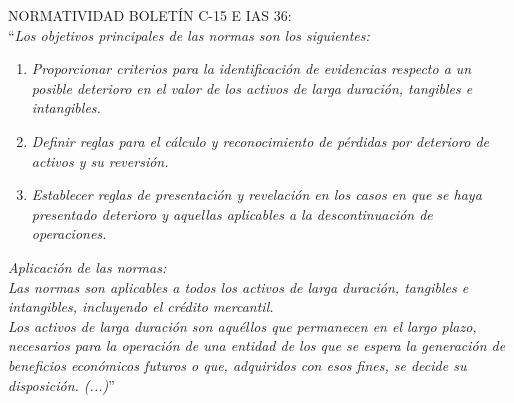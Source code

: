 \textcolor{principal}{NORMATIVIDAD BOLETÍN C-15 E IAS 36:}\\[10pt]

``\textit{Los objetivos principales de las normas son los siguientes:}\\

\begin{enumerate}[\itshape (a)]

\item \textit{Proporcionar criterios para la identificación de evidencias respecto a un posible deterioro en el valor de los activos de larga duración, tangibles e intangibles.}

\item \textit{Definir reglas para el cálculo y reconocimiento de pérdidas por deterioro de activos y su reversión.}

\item \textit{Establecer reglas de presentación y revelación en los casos en que se haya presentado deterioro y aquellas aplicables a la descontinuación de operaciones.}
\end{enumerate}


\textit{Aplicación de las normas:}\\

\textit{Las normas son aplicables a todos los activos de larga duración, tangibles e intangibles, incluyendo el crédito mercantil.}\\

\textit{Los activos de larga duración son aquéllos que permanecen en el largo plazo, necesarios para la operación de una entidad de los que se espera la generación de beneficios económicos futuros o que, adquiridos con esos fines, se decide su disposición. (...)}”\\


